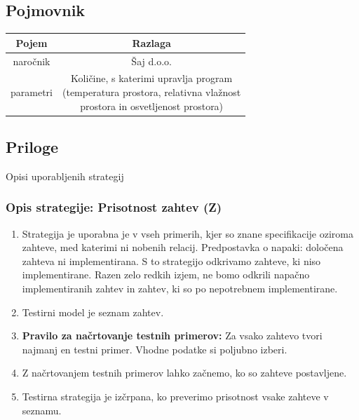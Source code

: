 \documentclass[a4paper,12pt]{article}
\newcommand{\mlc}[1]{\raisebox{0ex}{\makecell{#1}}}
\begin{document}
\newpage

	\subsection{Pojmovnik}
		
		\begin{center}
				\begin{tabular}{|c|c|}
					\hline
				    \rowcolor{purple!30!}Pojem&Razlaga\\
					\hline
				    \hline
					naročnik&Šaj d.o.o.\\
					\hline
					parametri&\mlc{Količine, s katerimi upravlja program \\(temperatura prostora, relativna vlažnost \\ prostora in osvetljenost prostora)}\\
					\hline
			\end{tabular}
		\end{center}


	\subsection{Priloge}

		\qquad \qquad Opisi uporabljenih strategij

		\subsubsection{Opis strategije: Prisotnost zahtev (Z)}

			\begin{enumerate}
				\item Strategija je uporabna je v vseh primerih, kjer so znane specifikacije 
					  oziroma zahteve, med katerimi ni nobenih relacij. Predpostavka o napaki: določena zahteva 
					  ni implementirana. S to strategijo odkrivamo zahteve, ki niso implementirane. 
					  Razen zelo redkih izjem, ne bomo odkrili napačno implementiranih zahtev in 
					  zahtev, ki so po nepotrebnem implementirane.
    			
			 	\item Testirni model je seznam zahtev.
				\item \textbf{Pravilo za načrtovanje testnih primerov:} Za vsako zahtevo tvori najmanj en testni primer. 
					  Vhodne podatke si poljubno izberi.
				\item Z načrtovanjem testnih primerov lahko začnemo, ko so zahteve postavljene.
				\item Testirna strategija je izčrpana, ko preverimo prisotnost vsake zahteve v seznamu.
			\end{enumerate}
\end{document}
